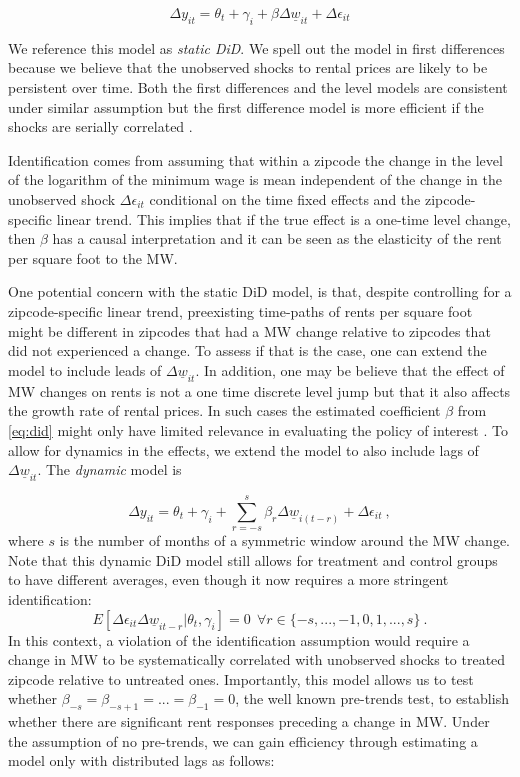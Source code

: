 \begin{equation}\label{eq:did}
        \Delta y_{it} = \theta_t + \gamma_i + \beta \Delta \underline{w}_{it} + \Delta \epsilon_{it}
\end{equation}

We reference this model as \textit{static DiD}. We spell out the model in first differences because 
we believe that the unobserved shocks to rental prices are likely to be persistent over time. Both 
the first differences and the level models are consistent under similar assumption but the first 
difference model is more efficient if the shocks are serially correlated \parencite{wooldridge2010}.

Identification comes from assuming that within a zipcode the change in the level of the logarithm 
of the minimum wage is mean independent of the change in the unobserved shock $\Delta \epsilon_{it}$ 
conditional on the time fixed effects and the zipcode-specific linear trend. This implies that if 
the true effect is a one-time level change, then $\beta$ has a causal interpretation and it can be 
seen as the elasticity of the rent per square foot to the MW.
    
One potential concern with the static DiD model, is that, despite controlling for a zipcode-specific 
linear trend, preexisting time-paths of rents per square foot might be different in zipcodes that 
had a MW change relative to zipcodes that did not experienced a change. To assess if that is the 
case, one can extend the model to include leads of $\Delta \underline{w}_{it}$. In addition, one 
may be believe that the effect of MW changes on rents is not a one time discrete level jump but that 
it also affects the growth rate of rental prices. In such cases the estimated coefficient $\beta$ 
from \autoref{eq:did} might only have limited relevance in evaluating the policy of interest 
\parencite{callaway2019difference}. To allow for dynamics in the effects, we extend the model to 
also include lags of $\Delta \underline{w}_{it}$. The \textit{dynamic} model is

\begin{equation}\label{eq:leads_lags}
    \Delta y_{it} = \theta_t + \gamma_i + \sum_{r=-s}^{s}\beta_r \Delta \underline{w}_{i(t-r)} 
    				+ \Delta \epsilon_{it} \ ,
\end{equation}
where $s$ is the number of months of a symmetric window around the MW change. Note that this 
dynamic DiD model still allows for treatment and control groups to have different averages, even though 
it now requires a more stringent identification: 
\[E \left[ \Delta \epsilon_{it} \Delta \underline{w}_{it-r} \big| \theta_{t}, \gamma_{i} \right] = 0
	\ \ \forall r\in\{-s, ..., -1, 0, 1, ..., s\} \ . \] 
In this context, a violation of the identification assumption would require a change in MW to be 
systematically correlated with unobserved shocks to treated zipcode relative to untreated ones. 
Importantly, this model allows us to test whether $\beta_{-s} = \beta_{-s+1} = ... = \beta_{-1} = 0$, 
the well known pre-trends test, to establish whether there are significant rent responses preceding 
a change in MW. Under the assumption of no pre-trends, we can gain efficiency through estimating a 
model only with distributed lags as follows:

